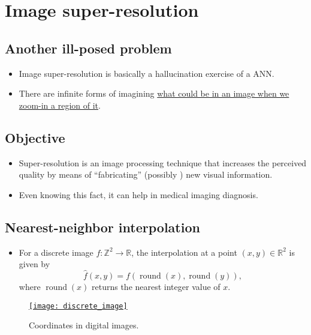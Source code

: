 \chapter{Image super-resolution}

\section{Another ill-posed problem}
\begin{itemize}
\item Image super-resolution is basically a hallucination exercise of
  a \gls{ANN}.
\item There are infinite forms of imagining
  \href{https://en.wikipedia.org/wiki/Super-resolution_imaging}{what
    could be in an image when we zoom-in a region of it}.
\end{itemize}

\section{Objective}
\begin{itemize}
\item Super-resolution is an image processing technique that
  increases the perceived quality by means of ``fabricating''
  (possibly ) new visual information.
\item Even knowing this fact, it can help in medical imaging
  diagnosis.
\end{itemize}

\section{Nearest-neighbor interpolation \cite{gonzalez2009digital}}
\begin{itemize}
\item For a discrete image $f: \mathbb{Z}^2 \to \mathbb{R}$, the interpolation at a point 
$(x,y) \in \mathbb{R}^2$ is given by
\begin{equation}
\hat{f}(x,y) = f\!\left( \operatorname{round}(x), \operatorname{round}(y) \right),
\end{equation}
where $\operatorname{round}(x)$ returns the nearest integer value of $x$.
\end{itemize}

\begin{figure}[H]
  \vspace{-2ex}
  \centering
  \href{https://www.mrecacademics.com/DepartmentStudyMaterials/20201220-Digital%20Image%20Processing%20Notes.pdf}{\texttt{[image: discrete\_image]}}
  \caption{Coordinates in digital images.}
  \label{fig:digital_image}
\end{figure}

